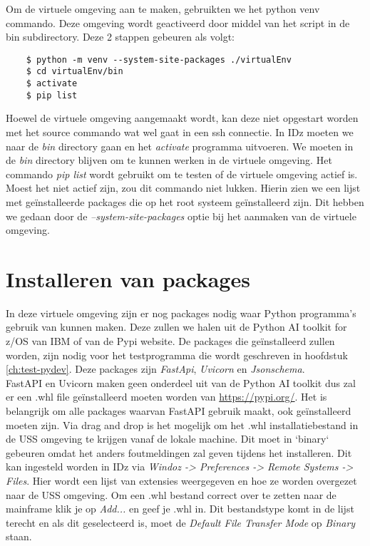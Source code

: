 Om de virtuele omgeving aan te maken, gebruikten we het python venv commando. Deze omgeving wordt geactiveerd door middel van het  script in de bin subdirectory. Deze 2 stappen gebeuren als volgt:

\begin{lstlisting}
    $ python -m venv --system-site-packages ./virtualEnv
    $ cd virtualEnv/bin
    $ activate
    $ pip list
\end{lstlisting}

Hoewel de virtuele omgeving aangemaakt wordt, kan deze niet opgestart worden met het source commando wat wel gaat in een ssh connectie. In IDz moeten we naar de \textit{bin} directory gaan en het \textit{activate} programma uitvoeren. We moeten in de \textit{bin} directory blijven om te kunnen werken in de virtuele omgeving.
Het commando \textit{pip list} wordt gebruikt om te testen of de virtuele omgeving actief is. Moest het niet actief zijn, zou dit commando niet lukken. Hierin zien we een lijst met geïnstalleerde packages die op het root systeem geïnstalleerd zijn. Dit hebben we gedaan door de \textit{--system-site-packages} optie bij het aanmaken van de virtuele omgeving.

\section{Installeren van packages}
In deze virtuele omgeving zijn er nog packages nodig waar Python programma's gebruik van kunnen maken. Deze zullen we halen uit de Python AI toolkit for z/OS van IBM of van de Pypi website. De packages die geïnstalleerd zullen worden, zijn nodig voor het testprogramma die wordt geschreven in hoofdstuk \ref{ch:test-pydev}. Deze packages zijn \textit{FastApi}, \textit{Uvicorn} en \textit{Jsonschema}. \\

FastAPI en Uvicorn maken geen onderdeel uit van de Python AI toolkit dus zal er een .whl file geïnstalleerd moeten worden van \url{https://pypi.org/}. Het is belangrijk om alle packages waarvan FastAPI gebruik maakt, ook geïnstalleerd moeten zijn. Via drag and drop is het mogelijk om het .whl installatiebestand in de USS omgeving te krijgen vanaf de lokale machine. Dit moet in `binary` gebeuren omdat het anders foutmeldingen zal geven tijdens het installeren. Dit kan ingesteld worden in IDz via \textit{Windoz -> Preferences -> Remote Systems -> Files}. Hier wordt een lijst van extensies weergegeven en hoe ze worden overgezet naar de USS omgeving. Om een .whl bestand correct over te zetten naar de mainframe klik je op \textit{Add...} en geef je .whl in. Dit bestandstype komt in de lijst terecht en als dit geselecteerd is, moet de \textit{Default File Transfer Mode} op \textit{Binary} staan. \\

